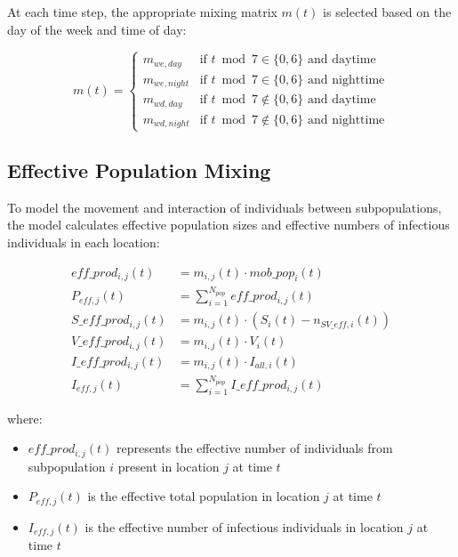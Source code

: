 \documentclass{article}
\begin{document}
At each time step, the appropriate mixing matrix $m(t)$ is selected based on the day of the week and time of day:

\begin{equation}
m(t) = 
\begin{cases}
m_{we,day} & \text{if } t \bmod 7 \in \{0, 6\} \text{ and daytime} \\
m_{we,night} & \text{if } t \bmod 7 \in \{0, 6\} \text{ and nighttime} \\
m_{wd,day} & \text{if } t \bmod 7 \notin \{0, 6\} \text{ and daytime} \\
m_{wd,night} & \text{if } t \bmod 7 \notin \{0, 6\} \text{ and nighttime}
\end{cases}
\end{equation}

\subsection{Effective Population Mixing}

To model the movement and interaction of individuals between subpopulations, the model calculates effective population sizes and effective numbers of infectious individuals in each location:

\begin{align}
eff\_prod_{i,j}(t) &= m_{i,j}(t) \cdot mob\_pop_i(t) \\
P_{eff,j}(t) &= \sum_{i=1}^{N_{pop}} eff\_prod_{i,j}(t) \\
S\_eff\_prod_{i,j}(t) &= m_{i,j}(t) \cdot (S_i(t) - n_{SV\_eff,i}(t)) \\
V\_eff\_prod_{i,j}(t) &= m_{i,j}(t) \cdot V_i(t) \\
I\_eff\_prod_{i,j}(t) &= m_{i,j}(t) \cdot I_{all,i}(t) \\
I_{eff,j}(t) &= \sum_{i=1}^{N_{pop}} I\_eff\_prod_{i,j}(t)
\end{align}

where:
\begin{itemize}
    \item $eff\_prod_{i,j}(t)$ represents the effective number of individuals from subpopulation $i$ present in location $j$ at time $t$
    \item $P_{eff,j}(t)$ is the effective total population in location $j$ at time $t$
    \item $I_{eff,j}(t)$ is the effective number of infectious individuals in location $j$ at time $t$
\end{itemize}
\end{document}
